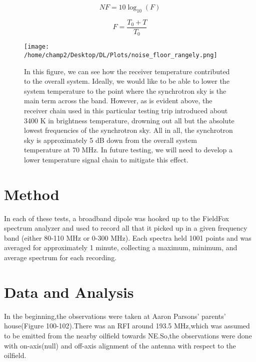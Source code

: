 \documentclass[11pt]{article}
\begin{document}
\citep{pritchard-loeb2010}

\begin{equation}
    \label{eq:noise-figure}
    NF = 10 \log_{10}(F)
\end{equation}

\begin{equation}
    \label{eq:noise-temp}
    F = \frac{T_0 + T}{T_0}
\end{equation}
\begin{figure}
    \begin{center}
    \texttt{[image: /home/champ2/Desktop/DL/Plots/noise\_floor\_rangely.png]}
    \end{center}
    \caption{
        In this figure, we can see how the receiver temperature contributed to 
        the overall system. Ideally, we would like to be able to lower the 
        system temperature to the point where the synchrotron sky is the main 
        term across the band. However, as is evident above, the receiver chain 
        used in this particular testing trip introduced about 3400 K in 
        brightness temperature, drowning out all but the absolute lowest 
        frequencies of the synchrotron sky. All in all, the synchrotron sky is 
        approximately 5 dB down from the overall system temperature at 70 MHz. 
        In future testing, we will need to develop a lower temperature signal 
        chain to mitigate this effect.
    }
    \label{fig:noise-floor}
\end{figure}


\section{Method}
	In each of these tests, a broadband dipole was hooked up to the FieldFox 
spectrum analyzer and used to record all that it picked up in a given frequency 
band (either 80-110 MHz or 0-300 MHz). Each spectra held 1001 points and was 
averaged for approximately 1 minute, collecting a maximum, minimum, and average 
spectrum for each recording.
	

\section{Data and Analysis}
In the beginning,the observations were taken at Aaron Parsons' parents' house(Figure 100-102).There was an RFI around 193.5 MHz,which was assumed to be emitted from the nearby oilfield towards NE.So,the observations were done with on-axis(null) and off-axis alignment of the antenna with respect to the oilfield.
\end{document}

